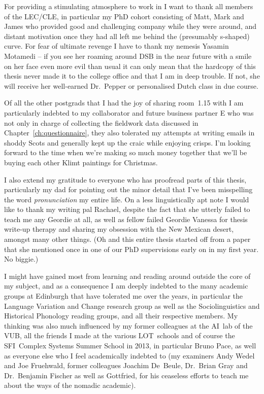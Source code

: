 \documentclass[twoside,10pt]{book}
\begin{document}
For providing a stimulating atmosphere to work in I want to thank all members of the LEC/CLE, in particular my PhD cohort consisting of Matt, Mark and James who provided good and challenging company while they were around, and distant motivation once they had all left me behind the (presumably s-shaped) curve.
For fear of ultimate revenge I have to thank my nemesis Yasamin Motamedi -- if you see her roaming around DSB in the near future with a smile on her face even more evil than usual it can only mean that the hardcopy of this thesis never made it to the college office and that I am in deep trouble. If not, she will receive her well-earned Dr.~Pepper or personalised Dutch class in due course.

Of all the other postgrads that I had the joy of sharing room~1.15 with I am particularly indebted to my collaborator and future business partner E who was not only in charge of collecting the fieldwork data discussed in Chapter~\ref{ch:questionnaire}, they also tolerated my attempts at writing emails in shoddy Scots and generally kept up the craic while enjoying crisps. I'm looking forward to the time when we're making so much money together that we'll be buying each other Klimt paintings for Christmas.

I also extend my gratitude to everyone who has proofread parts of this thesis, particularly my dad for pointing out the minor detail that I've been misspelling the word \emph{pronunciation} my entire life.
On a less linguistically apt note I would like to thank my writing pal Rachael, despite the fact that she utterly failed to teach me any Geordie at all, as well as fellow failed Geordie Vanessa for thesis write-up therapy and sharing my obsession with the New Mexican desert, amongst many other things. (Oh and this entire thesis started off from a paper that she mentioned once in one of our PhD supervisions early on in my first year. No biggie.)

I might have gained most from learning and reading around outside the core of my subject, and as a consequence I am deeply indebted to the many academic groups at Edinburgh that have tolerated me over the years, in particular the Language Variation and Change research group as well as the Sociolinguistics and Historical Phonology reading groups, and all their respective members. My thinking was also much influenced by my former colleagues at the AI~lab of the VUB, all the friends I made at the various LOT~schools and of course the SFI~Complex Systems Summer School in 2013, in particular Bruno Pace, as well as everyone else who I feel academically indebted to (my examiners Andy Wedel and Joe Fruehwald, former colleagues Joachim De~Beule, Dr.~Brian Gray and Dr.~Benjamin Fischer as well as Gottfried, for his ceaseless efforts to teach me about the ways of the nomadic academic).
\end{document}
